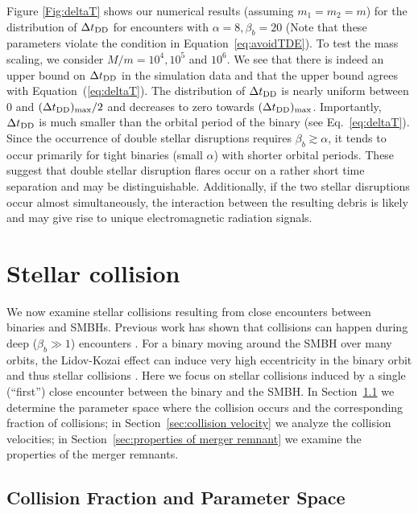 \documentclass[twocolumn]{aastex631}
\begin{document}
Figure \ref{Fig:deltaT} shows our numerical results (assuming $m_1=m_2=m$) for the distribution of $\Delta t_{\rm DD}$ for encounters with $\alpha = 8, \beta_b = 20$ (Note that these parameters violate the condition in Equation~\ref{eq:avoidTDE}).
To test the mass scaling, we consider $M/m=10^4, 10^5$ and $10^6$.
We see that there is indeed an upper bound on $\Delta t_{\rm DD}$ in the simulation data and that the upper bound agrees with Equation~(\ref{eq:deltaT}). 
The distribution of $\Delta t_{\rm DD}$ is nearly uniform between $0$ and $(\Delta t_{\rm DD})_{\rm max}/2$ and decreases to zero towards $(\Delta t_{\rm DD})_{\rm max}$. 
Importantly, $\Delta t_{\rm DD}$ is much smaller than the orbital period of the binary (see Eq.~\ref{eq:deltaT}). 
Since the occurrence of double stellar disruptions requires $\beta_b \gtrsim \alpha$, it tends to occur primarily for tight binaries (small $\alpha$) with shorter orbital periods.
These suggest that double stellar disruption flares occur on a rather short time separation and may be distinguishable. 
Additionally, if the two stellar disruptions occur almost simultaneously, the interaction between the resulting debris is likely and may give rise to unique electromagnetic radiation signals.


\section{Stellar collision}
\label{sec:stellar merger}

We now examine stellar collisions resulting from close encounters between binaries and SMBHs.
Previous work has shown that collisions can happen during deep ($\beta_b \gg 1$) encounters \citep{Ginsburg2007MNRAS}. 
For a binary moving around the SMBH over many orbits, the Lidov-Kozai effect can induce very high eccentricity in the binary orbit and thus stellar collisions \citep{Antonini2010ApJ}. 
Here we focus on stellar collisions induced by a single (``first'') close encounter between the binary and the SMBH.
In Section~\ref{sec:collision fraction} we determine the parameter space where the collision occurs and the corresponding fraction of collisions;
in Section~\ref{sec:collision velocity} we analyze the collision velocities; 
in Section~\ref{sec:properties of merger remnant} we examine the properties of the merger remnants.


\subsection{Collision Fraction and Parameter Space}
\label{sec:collision fraction}
\end{document}
